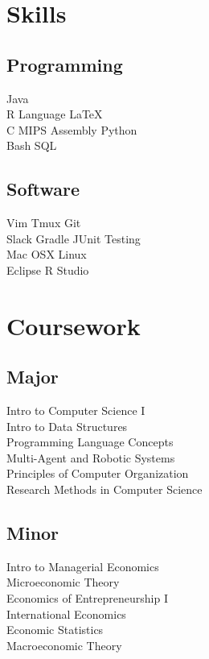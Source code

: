 \documentclass[]{brandon_ginoza_resume}
\begin{document}
\begin{minipage}[t]{0.33\textwidth}
\section{Skills}
\subsection{Programming}
Java \\
R Language \textbullet{} \LaTeX \\
C \textbullet{} MIPS Assembly \textbullet{} Python \\
Bash \textbullet{} SQL \\
\vspace{.1in}
\subsection{Software}
Vim \textbullet{} Tmux \textbullet{} Git \\
Slack \textbullet{} Gradle \textbullet{} JUnit Testing \\
Mac OSX \textbullet{} Linux \\
Eclipse \textbullet{} R Studio \\
\sectionsep


\section{Coursework}
\subsection{Major}
Intro to Computer Science I \\
Intro to Data Structures \\
Programming Language Concepts \\
Multi-Agent and Robotic Systems \\
Principles of Computer Organization \\
Research Methods in Computer Science \\
\sectionsep

\subsection{Minor}
Intro to Managerial Economics \\
Microeconomic Theory \\
Economics of Entrepreneurship I	\\
International Economics \\
Economic Statistics \\ 
Macroeconomic Theory \\
\sectionsep


\end{minipage}
\end{document}

